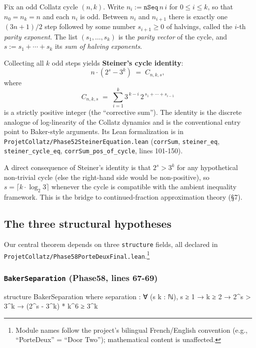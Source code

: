 \documentclass[
  11pt]{amsart}
\newenvironment{Shaded}{}{}
\newcommand{\NormalTok}[1]{#1}
\theoremstyle{plain}
\theoremstyle{definition}
\theoremstyle{remark}
\begin{document}
Fix an odd Collatz cycle \((n, k)\). Write
\(n_i := \mathtt{nSeq}\, n\, i\) for \(0 \leq i \leq k\), so that
\(n_0 = n_k = n\) and each \(n_i\) is odd. Between \(n_i\) and
\(n_{i+1}\) there is exactly one \((3n+1)/2\) step followed by some
number \(s_{i+1} \geq 0\) of halvings, called the \(i\)-th \emph{parity
exponent}. The list \((s_1, \ldots, s_k)\) is the \emph{parity vector}
of the cycle, and \(s := s_1 + \cdots + s_k\) its \emph{sum of halving
exponents}.

Collecting all \(k\) odd steps yields \textbf{Steiner's cycle identity}:
\[
n \cdot (2^s - 3^k) \;=\; C_{n, k, s},
\] where \[
C_{n, k, s} \;=\; \sum_{i=1}^{k} 3^{\,k-i}\, 2^{\,s_1 + \cdots + s_{i-1}}
\] is a strictly positive integer (the ``corrective sum''). The identity
is the discrete analogue of log-linearity of the Collatz dynamics and is
the conventional entry point to Baker-style arguments. Its Lean
formalization is in \texttt{ProjetCollatz/Phase52SteinerEquation.lean}
(\texttt{corrSum}, \texttt{steiner\_eq}, \texttt{steiner\_cycle\_eq},
\texttt{corrSum\_pos\_of\_cycle}, lines 101-150).

A direct consequence of Steiner's identity is that \(2^s > 3^k\) for any
hypothetical non-trivial cycle (else the right-hand side would be
non-positive), so \(s = \lceil k \cdot \log_2 3 \rceil\) whenever the
cycle is compatible with the ambient inequality framework. This is the
bridge to continued-fraction approximation theory (§7).

\subsection{The three structural
hypotheses}\label{the-three-structural-hypotheses}

Our central theorem depends on three \texttt{structure} fields, all
declared in
\texttt{ProjetCollatz/Phase58PorteDeuxFinal.lean}.\footnote{Module names
  follow the project's bilingual French/English convention (e.g.,
  ``PorteDeux'' = ``Door Two''); mathematical content is unaffected.}

\subsubsection*{\texorpdfstring{\texttt{BakerSeparation} (Phase58, lines
67-69)}{BakerSeparation (Phase58, lines 67-69)}}\label{bakerseparation-phase58-lines-67-69}

\begin{Shaded}
\begin{Highlighting}[]
\NormalTok{structure BakerSeparation where}
\NormalTok{  separation : ∀ (s k : ℕ), s ≥ 1 → k ≥ 2 → 2\^{}s \textgreater{} 3\^{}k →}
\NormalTok{    (2\^{}s {-} 3\^{}k) * k\^{}6 ≥ 3\^{}k}
\end{Highlighting}
\end{Shaded}
\end{document}
